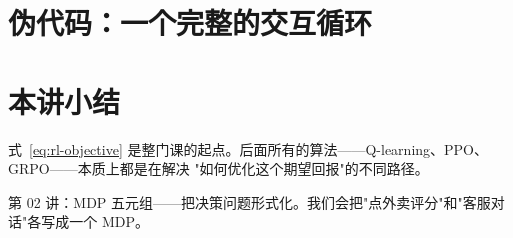 \documentclass{rl-lecture}
\begin{document}
\section{伪代码：一个完整的交互循环}



\section{本讲小结}

式~\ref{eq:rl-objective} 是整门课的起点。后面所有的算法——Q-learning、PPO、GRPO——本质上都是在解决
"如何优化这个期望回报"的不同路径。

\begin{keypoint}[下一讲预告]
第 02 讲：MDP 五元组——把决策问题形式化。我们会把"点外卖评分"和"客服对话"各写成一个 MDP。
\end{keypoint}
\end{document}
